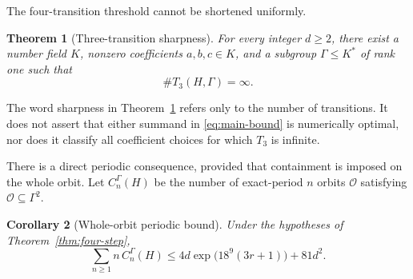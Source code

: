 \documentclass[11pt]{article}
\newtheorem{theorem}{Theorem}[section]
\newtheorem{corollary}[theorem]{Corollary}
\theoremstyle{definition}
\theoremstyle{remark}
\begin{document}
The four-transition threshold cannot be shortened uniformly.

\begin{theorem}[Three-transition sharpness]\label{thm:three-step}
For every integer \(d\ge2\), there exist a number field \(K\), nonzero
coefficients \(a,b,c\in K\), and a subgroup \(\Gamma\le K^\ast\) of rank one
such that
\[
 \#T_3(H,\Gamma)=\infty.
\]
\end{theorem}

The word sharpness in Theorem~\ref{thm:three-step} refers only to the number
of transitions.  It does not assert that either summand in
\eqref{eq:main-bound} is numerically optimal, nor does it classify all
coefficient choices for which \(T_3\) is infinite.

There is a direct periodic consequence, provided that containment is imposed
on the whole orbit.  Let \(C_n^\Gamma(H)\) be the number of exact-period
\(n\) orbits \(\mathcal O\) satisfying
\(\mathcal O\subseteq\Gamma^2\).

\begin{corollary}[Whole-orbit periodic bound]\label{cor:periodic}
Under the hypotheses of Theorem~\ref{thm:four-step},
\begin{equation}\label{eq:periodic-bound}
 \sum_{n\ge1}n\,C_n^\Gamma(H)
 \le
 4d\exp\!\bigl(18^9(3r+1)\bigr)+81d^2.
\end{equation}
\end{corollary}
\end{document}
